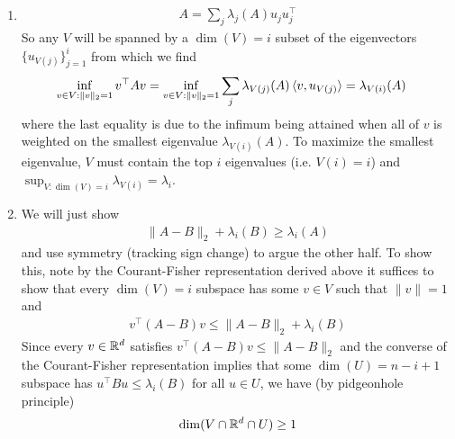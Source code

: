 \documentclass[12pt,letterpaper,boxed]{hmcpset}
\begin{document}
\begin{solution}
  \begin{enumerate}
    \item
      \begin{align}
	A = \sum_j \lambda_j(A) u_j u_j^\top
      \end{align}
      So any $V$ will be spanned by a $\dim(V) = i$ subset
      of the eigenvectors $\{u_{V(j)}\}_{j=1}^i$ from which we find
      \begin{align}
	\inf_{v \in V: \|v\|_2 = 1} v^\top A v
	&= \inf_{v \in V: \|v\|_2 = 1} \sum_j \lambda_{V(j)}(A) \braket{v, u_{V(j)}}
	= \lambda_{V(i)}(A)
      \end{align}
      where the last equality is due to the infimum being attained when
      all of $v$ is weighted on the smallest eigenvalue $\lambda_{V(i)}(A)$.
      To maximize the smallest eigenvalue, $V$ must contain the top $i$
      eigenvalues (i.e. $V(i) = i$) and $\sup_{V : \dim(V) = i} \lambda_{V(i)} = \lambda_i$.
    \item
      We will just show
      \begin{align}
	\|A - B\|_2 + \lambda_i(B) \geq \lambda_i(A)
      \end{align}
      and use symmetry (tracking sign change) to argue the other half.
      To show this, note by the Courant-Fisher representation derived above
      it suffices to show that every $\dim(V)=i$ subspace has some $v \in V$
      such that $\|v\|=1$ and
      \begin{align}
	v^\top(A-B)v \leq \|A - B\|_2 + \lambda_i(B)
      \end{align}
      Since every $v \in \mathbb{R}^d$ satisfies $v^\top (A - B) v \leq \|A - B\|_2$
      and the converse of the Courant-Fisher representation implies that some
      $\dim(U) = n - i + 1$ subspace has $u^\top B u \leq \lambda_i(B)$ for all
      $u \in U$, we have (by pidgeonhole principle)
      \begin{align}
	\dim(V \cap \mathbb{R}^d \cap U)
	\geq 1
      \end{align}
  \end{enumerate}
\end{solution}

\begin{problem}
\end{problem}
\end{document}
